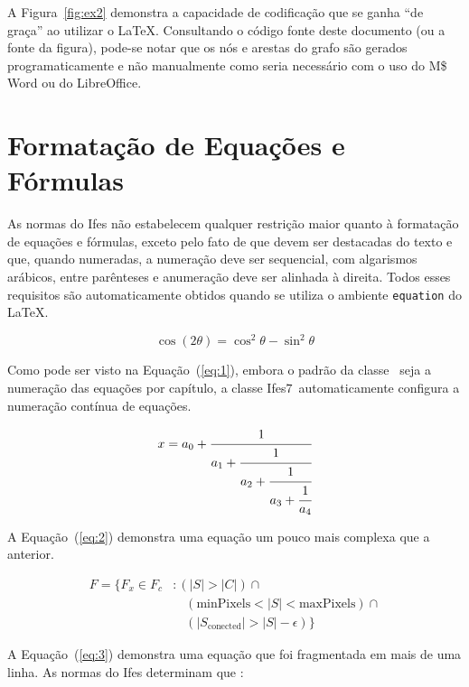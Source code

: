 \documentclass[12pt,times,a4paper,english,brazil,
chapter=TITLE,section=TITLE,subsection=TITLE]{ifes7}
\newcommand{\ifestex}{\textsf{Ifes$7$}}
\begin{document}
A Figura~\ref{fig:ex2} demonstra a capacidade de codificação que se
ganha ``de graça'' ao utilizar o \LaTeX. Consultando o código fonte
deste documento (ou a fonte da figura), pode-se notar que os nós e
arestas do grafo são gerados programaticamente e não manualmente como
seria necessário com o uso do M\$ Word ou do LibreOffice.


\section{Formatação de Equações e Fórmulas}
\label{sec:format-equac}

As normas do Ifes não estabelecem qualquer restrição maior quanto à
formatação de equações e fórmulas, exceto pelo fato de que devem ser
destacadas do texto e que, quando numeradas, a numeração deve ser
sequencial, com algarismos arábicos, entre parênteses e anumeração
deve ser alinhada à direita. Todos esses requisitos são
automaticamente obtidos quando se utiliza o ambiente \texttt{equation}
do \LaTeX.

\begin{equation}
  \label{eq:1}
  \cos (2\theta) = \cos^2 \theta - \sin^2 \theta
\end{equation}

Como pode ser visto na Equação~(\ref{eq:1}), embora o padrão da classe
\abnTeX\ seja a numeração das equações por capítulo, a classe
\ifestex\ automaticamente configura a numeração contínua de equações.

\begin{equation}
  \label{eq:2}
  x = a_0 + \cfrac{1}{a_1 
    + \cfrac{1}{a_2 
      + \cfrac{1}{a_3 + \cfrac{1}{a_4}}}}
\end{equation}

A Equação~(\ref{eq:2}) demonstra uma equação um pouco mais complexa
que a anterior.

\begin{equation}
  \label{eq:3}
  \begin{split}
    F = \{F_{x} \in  F_{c} &: (|S| > |C|) \cap {}\\
    &\quad (\text{minPixels}  < |S| < \text{maxPixels}) \cap {} \\
    &\quad (|S_{\text{conected}}| > |S| - \epsilon) \}
  \end{split}
\end{equation}

A Equação~(\ref{eq:3}) demonstra uma equação que foi fragmentada em
mais de uma linha. As normas do Ifes determinam que
\cite[p.~38]{Ifes2014}:
\end{document}

